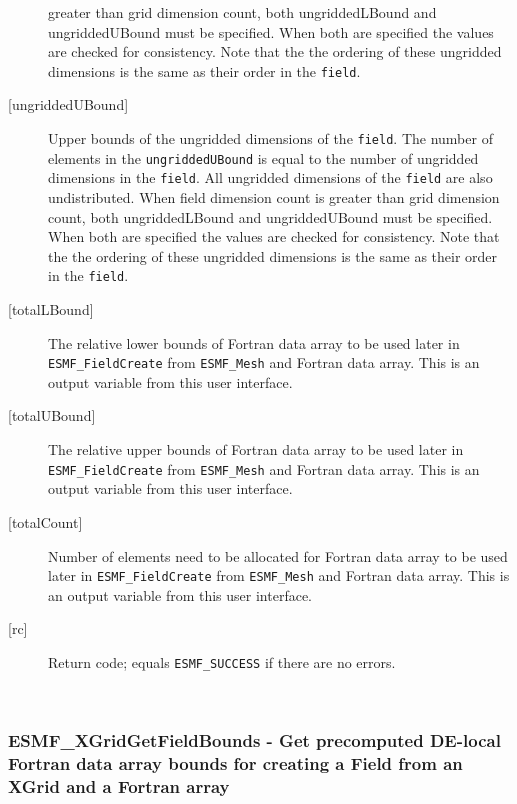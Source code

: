 \begin{description}
         greater than grid dimension count, both ungriddedLBound and ungriddedUBound
         must be specified. When both are specified the values are checked
         for consistency.  Note that the the ordering of
         these ungridded dimensions is the same as their order in the {\tt field}.
   \item [{[ungriddedUBound]}]
         Upper bounds of the ungridded dimensions of the {\tt field}.
         The number of elements in the {\tt ungriddedUBound} is equal to the number of ungridded
         dimensions in the {\tt field}.  All ungridded dimensions of the
         {\tt field} are also undistributed. When field dimension count is
         greater than grid dimension count, both ungriddedLBound and ungriddedUBound
         must be specified. When both are specified the values are checked
         for consistency.  Note that the the ordering of
         these ungridded dimensions is the same as their order in the {\tt field}.
   \item [{[totalLBound]}]
         \begin{sloppypar}
         The relative lower bounds of Fortran data array to be used
         later in {\tt ESMF\_FieldCreate} from {\tt ESMF\_Mesh} and Fortran data array.
         This is an output variable from this user interface.
         \end{sloppypar}
   \item [{[totalUBound]}]
         \begin{sloppypar}
         The relative upper bounds of Fortran data array to be used
         later in {\tt ESMF\_FieldCreate} from {\tt ESMF\_Mesh} and Fortran data array.
         This is an output variable from this user interface.
         \end{sloppypar}
   \item [{[totalCount]}]
         Number of elements need to be allocated for Fortran data array to be used
         later in {\tt ESMF\_FieldCreate} from {\tt ESMF\_Mesh} and Fortran data array.
         This is an output variable from this user interface.
  
   \item[{[rc]}]
       Return code; equals {\tt ESMF\_SUCCESS} if there are no errors.
   \end{description} 
 
\mbox{}\hrulefill\ 
 
\subsubsection [ESMF\_XGridGetFieldBounds] {ESMF\_XGridGetFieldBounds - Get precomputed DE-local Fortran data array bounds for creating a Field from an XGrid and a Fortran array}



